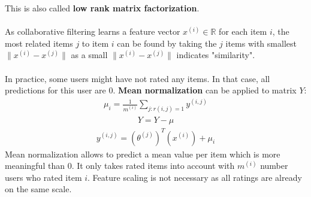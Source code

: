 \documentclass{report}
\begin{document}
This is also called {\bf low rank matrix factorization}.
\\
\\
As collaborative filtering learns a feature vector $x^{(i)}\in \mathbb{R}$ for each item $i$, the most related items $j$ to item $i$ can be found by taking the $j$ items with smallest $\lVert x^{(i)} - x^{(j)}\rVert$ as a small $\lVert x^{(i)} - x^{(j)}\rVert$ indicates "similarity".
\\
\\
In practice, some users might have not rated any items. In that case, all predictions for this user are $0$. {\bf Mean normalization} can be applied to matrix $Y$:
\begin{align*}
\mu_i = \frac{1}{m^{(i)}} \sum_{j:r(i,j)=1}y^{(i,j)}
\end{align*}
\begin{align*}
Y = Y - \mu
\end{align*}
\begin{align*}
y^{(i,j)}=(\theta^{(j)})^T(x^{(i)})+\mu_i
\end{align*}
Mean normalization allows to predict a mean value per item which is more meaningful than $0$. It only takes rated items into account with $m^{(i)}$ number users who rated item $i$. Feature scaling is not necessary as all ratings are already on the same scale.
\end{document}
